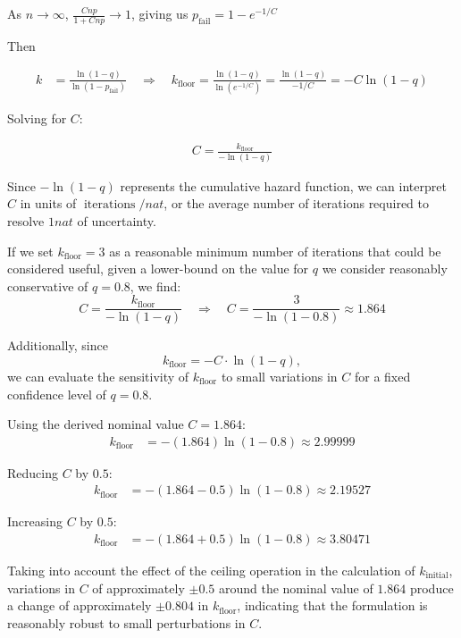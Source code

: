 As $n \to \infty$, $\frac{C n p}{1 + C n p} \to 1$, giving us $p_{\text{fail}} = 1 - e^{-1/C}$

Then

\begin{align}
    k &= \frac{\ln(1 - q)}{\ln(1 - p_{\text{fail}})} 
    \quad \Rightarrow \quad
    k_{\text{floor}} = \frac{\ln(1 - q)}{\ln(e^{-1/C})} 
    = \frac{\ln(1 - q)}{-1/C} 
    = - C \ln(1 - q)
\end{align}

Solving for $C$:

\begin{align}
    C = \frac{k_{\text{floor}}}{- \ln(1 - q)}
\end{align}

Since $- \ln(1 - q)$ represents the cumulative hazard function, we can interpret $C$ in units of $\operatorname{iterations} / nat$, or the average number of iterations required to resolve $1 nat$ of uncertainty.

If we set $k_{\text{floor}} = 3$ as a reasonable minimum number of iterations that could be considered useful, given a lower-bound on the value for $q$ we consider reasonably conservative of $q = 0.8$, we find:
\[
C = \frac{k_{\text{floor}}}{- \ln(1 - q)} 
\quad \Rightarrow \quad 
C = \frac{3}{- \ln(1 - 0.8)} \approx 1.864
\]

Additionally, since
\[
    k_{\text{floor}} = -C \cdot \ln(1 - q),
\]
we can evaluate the sensitivity of $k_{\text{floor}}$ to small variations in $C$ for a fixed confidence level of $q = 0.8$.

Using the derived nominal value $C = 1.864$:
\begin{align*}
k_{\text{floor}}
    &= -(1.864)\ln(1 - 0.8)
    \approx 2.99999
\end{align*}

Reducing $C$ by $0.5$:
\begin{align*}
k_{\text{floor}}
    &= -(1.864 - 0.5)\ln(1 - 0.8)
    \approx 2.19527
\end{align*}

Increasing $C$ by $0.5$:
\begin{align*}
k_{\text{floor}}
    &= -(1.864 + 0.5)\ln(1 - 0.8)
    \approx 3.80471
\end{align*}

Taking into account the effect of the ceiling operation in the calculation of $k_{\text{initial}}$, variations in $C$ of approximately $\pm 0.5$ around the nominal value of $1.864$ produce a change of approximately $\pm 0.804$ in $k_{\text{floor}}$, indicating that the formulation is reasonably robust to small perturbations in $C$.

